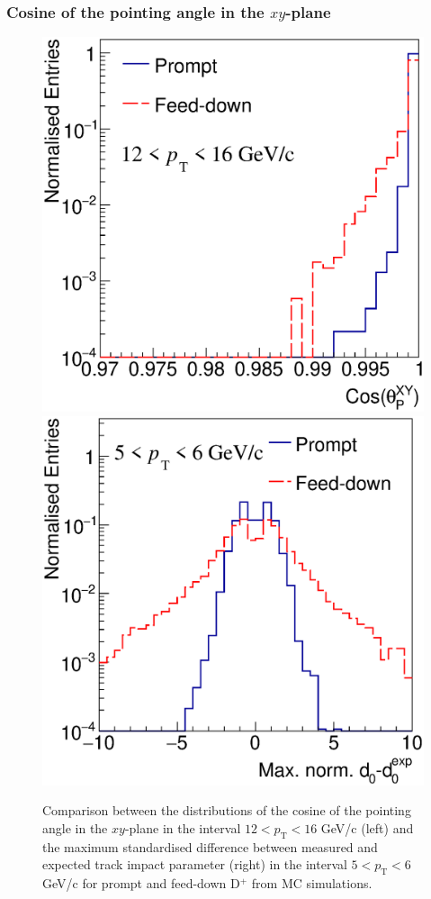 \documentclass[b5paper,10pt,twoside,oldstyle,classica]{toptesi}
\newcommand{\pt}{p_\text{T}}
\begin{document}
\subsubsection{Cosine of the pointing angle in the $xy$-plane}
\begin{figure}[tb]
\begin{center}
{\includegraphics[scale = 0.3]{CompPromptFD_CospXY_12-16.eps}}
\hspace{0cm}
{\includegraphics[scale = 0.3]{CompPromptFD_d0d0exp_5-6.eps}}
\caption{Comparison between the distributions of the cosine of the pointing angle in the $xy$-plane in the interval $12<\pt<16$ GeV/c (left) and the maximum standardised difference between measured and expected track impact parameter (right) in the interval $5<\pt<6$ GeV/c for prompt and feed-down D$^+$ from MC simulations.}
\label{CospPromptFD}
\end{center}
\end{figure}
\end{document}
